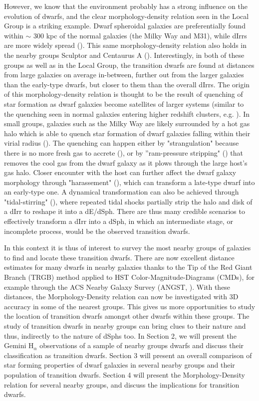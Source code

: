 \documentclass[12pt,preprint]{emulateapj}
\begin{document}
However, we know that the environment probably has a strong influence on the evolution of dwarfs, and the clear morphology-density relation seen in 
the Local Group is a striking example. Dwarf spheroidal galaxies are preferentially found within $\sim$ 300 kpc of the normal galaxies (the Milky Way 
and M31), while dIrrs are more widely spread (\cite{vdb94a}). This same morphology-density relation also holds in the nearby groups Sculptor and 
Centaurus A (\cite{cds09}). Interestingly, in both of these groups as well as in the Local Group, the transition dwarfs are found at distances from large 
galaxies on average in-between, further out from the larger galaxies than the early-type dwarfs, but closer to them than the overall dIrrs. The origin of 
this morphology-density relation is thought to be the result of quenching of star formation as dwarf galaxies become satellites of larger systems (similar
to the quenching seen in normal galaxies entering higher redshift clusters, e.g. \cite{go03}). In small groups, galaxies such as the Milky Way are likely 
surrounded by a hot gas halo which is able to quench star formation of dwarf galaxies falling within their virial radius (\cite{grp09}). The quenching can 
happen either by "strangulation" because there is no more fresh gas to accrete (\cite{ltc80}), or by ''ram-pressure stripping" (\cite{gg72}) that removes 
the cool gas from the dwarf galaxy as it plows through the large host's gas halo. Closer encounter with the host can further affect the dwarf galaxy 
morphology through "harassement" (\cite{mkldo96}), which can transform a late-type dwarf into an early-type one. A dynamical transformation can also
be achieved through "tidal-stirring" (\cite{mgc01a}), where repeated tidal shocks partially strip the halo and disk of a dIrr to reshape it into a dE/dSph. 
There are thus many credible scenarios to effectively transform a dIrr into a dSph, in which an intermediate stage, or incomplete process, would be the 
observed transition dwarfs.

In this context it is thus of interest to survey the most nearby groups of galaxies to find and locate these transition dwarfs. There are now excellent 
distance estimates for many dwarfs in nearby galaxies thanks to the Tip of the Red Giant Branch (TRGB) method applied to HST Color-Magnitude-Diagrams 
(CMDs), for example through the ACS Nearby Galaxy Survey (ANGST, \cite{dal09}). With these distances, the Morphology-Density relation can now be 
investigated with 3D accuracy in some of the nearest groups. This gives us more opportunities to study the location of transition dwarfs amongst other 
dwarfs within these groups. The study of transition dwarfs in nearby groups can bring clues to their nature and thus, indirectly to the nature of dSphs
too. In Section 2, we will present the Gemini H$_\alpha$ observations of a sample of nearby groups dwarfs and discuss their classification as transition 
dwarfs. Section 3 will present an overall comparison of star forming properties of dwarf galaxies in several nearby groups and their population of transition 
dwarfs. Section 4 will present the Morphology-Density relation for several nearby groups, and discuss the implications for transition dwarfs.
\end{document}
